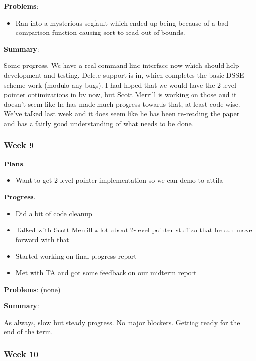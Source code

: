 \noindent \textbf{Problems}: 
\begin{itemize}
\item Ran into a mysterious segfault which ended up being because of a bad comparison function causing sort to read out of bounds. 
\end{itemize}

\noindent \textbf{Summary}: 

Some progress. We have a real command-line interface now which should help development and testing. Delete support is in, which completes the basic DSSE scheme work (modulo any bugs). I had hoped that we would have the 2-level pointer optimizations in by now, but Scott Merrill is working on those and it doesn't seem like he has made much progress towards that, at least code-wise. We've talked last week and it does seem like he has been re-reading the paper and has a fairly good understanding of what needs to be done. 


\subsubsection{Week 9}

\noindent \textbf{Plans}:
\begin{itemize}
\item Want to get 2-level pointer implementation so we can demo to attila 
\end{itemize}

\noindent \textbf{Progress}:
\begin{itemize}
\item Did a bit of code cleanup 
\item Talked with Scott Merrill a lot about 2-level pointer stuff so that he can move forward with that 
\item Started working on final progress report 
\item Met with TA and got some feedback on our midterm report 
\end{itemize}

\noindent \textbf{Problems}:
(none)

\noindent \textbf{Summary}:

As always, slow but steady progress. No major blockers. Getting ready for the end of the term. 



\subsubsection{Week 10}

